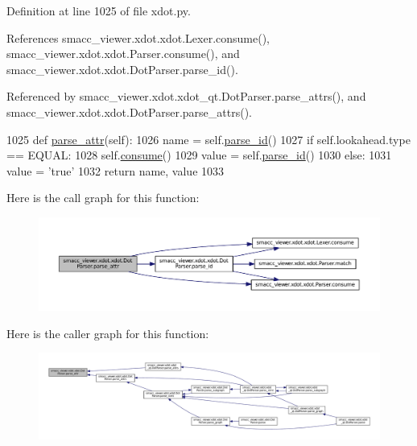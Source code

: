 Definition at line 1025 of file xdot.\+py.



References smacc\+\_\+viewer.\+xdot.\+xdot.\+Lexer.\+consume(), smacc\+\_\+viewer.\+xdot.\+xdot.\+Parser.\+consume(), and smacc\+\_\+viewer.\+xdot.\+xdot.\+Dot\+Parser.\+parse\+\_\+id().



Referenced by smacc\+\_\+viewer.\+xdot.\+xdot\+\_\+qt.\+Dot\+Parser.\+parse\+\_\+attrs(), and smacc\+\_\+viewer.\+xdot.\+xdot.\+Dot\+Parser.\+parse\+\_\+attrs().


\begin{DoxyCode}
1025     \textcolor{keyword}{def }\hyperlink{classsmacc__viewer_1_1xdot_1_1xdot_1_1DotParser_afedd198fd7d76e36e655416c11772189}{parse\_attr}(self):
1026         name = self.\hyperlink{classsmacc__viewer_1_1xdot_1_1xdot_1_1DotParser_aec7bb154831d9a665fbd1a6b609dc340}{parse\_id}()
1027         \textcolor{keywordflow}{if} self.lookahead.type == EQUAL:
1028             self.\hyperlink{classsmacc__viewer_1_1xdot_1_1xdot_1_1Parser_ab70715898a2ec0b51c6b333b73c78c37}{consume}()
1029             value = self.\hyperlink{classsmacc__viewer_1_1xdot_1_1xdot_1_1DotParser_aec7bb154831d9a665fbd1a6b609dc340}{parse\_id}()
1030         \textcolor{keywordflow}{else}:
1031             value = \textcolor{stringliteral}{'true'}
1032         \textcolor{keywordflow}{return} name, value
1033 
\end{DoxyCode}


Here is the call graph for this function\+:
\nopagebreak
\begin{figure}[H]
\begin{center}
\leavevmode
\includegraphics[width=350pt]{classsmacc__viewer_1_1xdot_1_1xdot_1_1DotParser_afedd198fd7d76e36e655416c11772189_cgraph}
\end{center}
\end{figure}




Here is the caller graph for this function\+:
\nopagebreak
\begin{figure}[H]
\begin{center}
\leavevmode
\includegraphics[width=350pt]{classsmacc__viewer_1_1xdot_1_1xdot_1_1DotParser_afedd198fd7d76e36e655416c11772189_icgraph}
\end{center}
\end{figure}


